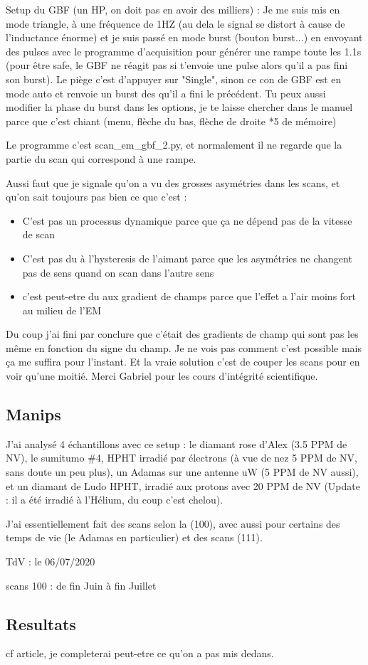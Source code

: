 \documentclass[a4paper]{report}
\begin{document}
  Setup du GBF (un HP, on doit pas en avoir des milliers) : Je me suis mis en mode triangle, à une fréquence de 1HZ (au dela le signal se distort à cause de l'inductance énorme) et je suis passé en mode burst (bouton burst...) en envoyant des pulses avec le programme d'acquisition pour générer une rampe toute les 1.1s (pour être safe, le GBF ne réagit pas si t'envoie une pulse alors qu'il a pas fini son burst). Le piège c'est d'appuyer sur "Single", sinon ce con de GBF est en mode auto et renvoie un burst des qu'il a fini le précédent. Tu peux aussi modifier la phase du burst dans les options, je te laisse chercher dans le manuel parce que c'est chiant (menu, flèche du bas, flèche de droite *5 de mémoire)
  
  Le programme c'est scan\_em\_gbf\_2.py, et normalement il ne regarde que la partie du scan qui correspond à une rampe.
  
  Aussi faut que je signale qu'on a vu des grosses asymétries dans les scans, et qu'on sait toujours pas bien ce que c'est :
 \begin{itemize}
 \item C'est pas un processus dynamique parce que ça ne dépend pas de la vitesse de scan
 \item C'est pas du à l'hysteresis de l'aimant parce que les asymétries ne changent pas de sens quand on scan dans l'autre sens
 \item c'est peut-etre du aux gradient de champs parce que l'effet a l'air moins fort au milieu de l'EM
 \end{itemize}
 Du coup j'ai fini par conclure que c'était des gradients de champ qui sont pas les même en fonction du signe du champ. Je ne vois pas comment c'est possible mais ça me suffira pour l'instant. Et la vraie solution c'est de couper les scans pour en voir qu'une moitié. Merci Gabriel pour les cours d'intégrité scientifique.
 
 \subsection{Manips}
 J'ai analysé 4 échantillons avec ce setup : le diamant rose d'Alex (3.5 PPM de NV), le sumitumo \#4, HPHT irradié par électrons (à vue de nez 5 PPM de NV, sans doute un peu plus), un Adamas sur une antenne uW (5 PPM de NV aussi), et un diamant de Ludo HPHT, irradié aux protons avec 20 PPM de NV (Update : il a été irradié à l'Hélium, du coup c'est chelou). 
 
 J'ai essentiellement fait des scans selon la (100), avec aussi pour certains des temps de vie (le Adamas en particulier) et des scans (111).
 
 TdV : le 06/07/2020
 
 scans 100 : de fin Juin à fin Juillet
 
 \subsection{Resultats}
 cf article, je completerai peut-etre ce qu'on a pas mis dedans.
  
\end{document}
